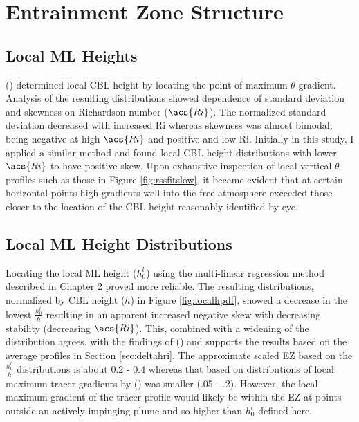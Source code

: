 
\section{Entrainment Zone Structure}

\subsection{Local \acs{ML} Heights}

\citeauthor{SullMoengStev} (\citeyear{SullMoengStev}) determined local \acs{CBL} height by locating the point of maximum $\theta$ gradient.  Analysis of the resulting distributions showed dependence of standard deviation and skewness on Richardson number ($\acs{Ri}$).  The normalized standard deviation decreased with increased \acs{Ri} whereas skewness was almost bimodal; being negative at high $\acs{Ri}$ and positive and low \acs{Ri}.  Initially in this study, I applied a similar method and found local \acs{CBL} height distributions with lower $\acs{Ri}$ to have positive skew.  Upon exhaustive inspection of local vertical $\theta$  profiles such as those in Figure \ref{fig:rssfitslow}, it became evident that at certain horizontal points high gradients well into the free atmosphere exceeded those closer to the location of the \acs{CBL} height reasonably identified by eye.\\

\subsection{Local \acs{ML} Height Distributions}

Locating the local \acs{ML} height ($h^{l}_{0}$) using the multi-linear regression method described in Chapter 2 proved more reliable.  The resulting distributions, normalized by \acs{CBL} height ($h$) in Figure \ref{fig:localhpdf},  showed a decrease in the lowest $\frac{h^{l}_{0}}{h}$ resulting in an apparent increased negative skew with decreasing stability (decreasing $\acs{Ri}$). This, combined with a widening of the distribution agrees, with the findings of \citeauthor{SullMoengStev} (\citeyear{SullMoengStev}) and supports the results based on the average profiles in Section \ref{sec:deltahri}.  The approximate scaled \acs{EZ} based on the $\frac{h^{l}_{0}}{h}$ distributions is about 0.2 - 0.4 whereas that based on distributions of local maximum tracer gradients by  \citeauthor{BrooksFowler2} (\citeyear{BrooksFowler2}) was smaller (.05 - .2).  However, the local maximum gradient of the tracer profile would likely be within the \acs{EZ} at points outside an actively impinging plume and so higher than $h^{l}_{0}$ defined here. \\  

